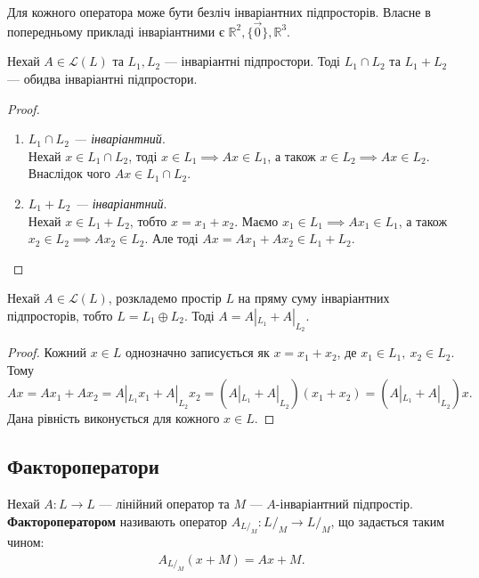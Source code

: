 \documentclass{math_library}
\begin{document}
\begin{remark}
Для кожного оператора може бути безліч інваріантних підпросторів. Власне в попередньому прикладі інваріантними є $\mathbb{R}^2, \{\vec{0}\}, \mathbb{R}^3$.
\end{remark}
\fi

\begin{lemma}
Нехай $A \in \mathcal{L}(L)$ та $L_1, L_2$ --- інваріантні підпростори. Тоді $L_1 \cap L_2$ та $L_1 + L_2$ --- обидва інваріантні підпростори.
\end{lemma}

\begin{proof}
\begin{enumerate}[wide=0pt, topsep=0pt,label={\Roman*.}]
\item \textit{$L_1 \cap L_2$ --- інваріантний}.\\
Нехай $x \in L_1 \cap L_2$, тоді $x \in L_1 \implies Ax \in L_1$, а також $x \in L_2 \implies Ax \in L_2$. Внаслідок чого $Ax \in L_1 \cap L_2$.

\item \textit{$L_1 + L_2$ --- інваріантний}.\\
Нехай $x \in L_1+L_2$, тобто $x = x_1 + x_2$. Маємо $x_1 \in L_1 \implies Ax_1 \in L_1$, а також $x_2 \in L_2 \implies Ax_2 \in L_2$. Але тоді $Ax = Ax_1 + Ax_2 \in L_1+L_2$.  \qedhere
\end{enumerate}
\end{proof}

\begin{proposition}
Нехай $A \in \mathcal{L}(L)$, розкладемо простір $L$ на пряму суму інваріантних підпросторів, тобто $L = L_1  \oplus  L_2$. Тоді $A = A|_{L_1} + A|_{L_2}$.
\end{proposition}

\begin{proof}
Кожний $x \in L$ однозначно записується як $x = x_1 + x_2$, де $x_1 \in L_1,\ x_2 \in L_2$. Тому
\[
Ax = Ax_1 + Ax_2 = A|_{L_1}x_1 + A|_{L_2}x_2 = (A|_{L_1}+A|_{L_2})(x_1 + x_2) = (A|_{L_1}+A|_{L_2})x.
\]
Дана рівність виконується для кожного $x \in L$.
\end{proof}

\subsection{Фактороператори}
\begin{definition}
Нехай $A \colon L \to L$ --- лінійний оператор та $M$ --- $A$-інваріантний підпростір.\\
\textbf{Фактороператором} називають оператор $A_{L/_M} \colon L/_M \to L/_M$, що задається таким чином:
\begin{align*}
A_{L/_M}(x + M) =  Ax + M.
\end{align*}
\end{definition}
\end{document}
